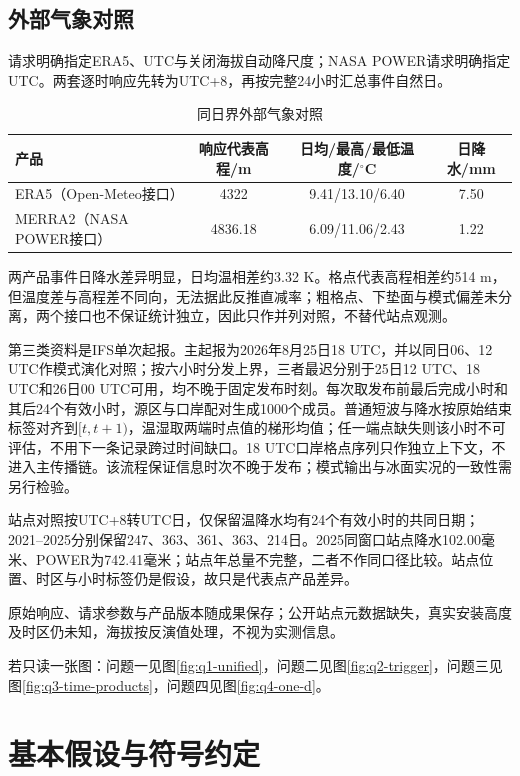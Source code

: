 \subsection{外部气象对照}
请求明确指定ERA5、UTC与关闭海拔自动降尺度；NASA POWER请求明确指定UTC。两套逐时响应先转为UTC+8，再按完整24小时汇总事件自然日。
\begin{table}[htbp]\centering\small
\caption{同日界外部气象对照}\label{tab:extmet}
\begin{tabular}{@{}l c c c@{}}\toprule
产品&响应代表高程/m&日均/最高/最低温度/$^\circ$C&日降水/mm\\\midrule
ERA5（Open-Meteo接口）&4322&9.41/13.10/6.40&7.50\\
MERRA2（NASA POWER接口）&4836.18&6.09/11.06/2.43&1.22\\\bottomrule
\end{tabular}\end{table}
两产品事件日降水差异明显，日均温相差约3.32 K。格点代表高程相差约514 m，但温度差与高程差不同向，无法据此反推直减率；粗格点、下垫面与模式偏差未分离，两个接口也不保证统计独立，因此只作并列对照，不替代站点观测。

第三类资料是IFS单次起报。主起报为2026年8月25日18 UTC，并以同日06、12 UTC作模式演化对照；按六小时分发上界，三者最迟分别于25日12 UTC、18 UTC和26日00 UTC可用，均不晚于固定发布时刻。每次取发布前最后完成小时和其后24个有效小时，源区与口岸配对生成1000个成员。普通短波与降水按原始结束标签对齐到$[t,t+1)$，温湿取两端时点值的梯形均值；任一端点缺失则该小时不可评估，不用下一条记录跨过时间缺口。18 UTC口岸格点序列只作独立上下文，不进入主传播链。该流程保证信息时次不晚于发布；模式输出与冰面实况的一致性需另行检验。

站点对照按UTC+8转UTC日，仅保留温降水均有24个有效小时的共同日期；2021--2025分别保留247、363、361、363、214日。2025同窗口站点降水102.00毫米、POWER为742.41毫米；站点年总量不完整，二者不作同口径比较。站点位置、时区与小时标签仍是假设，故只是代表点产品差异。

原始响应、请求参数与产品版本随成果保存；公开站点元数据缺失，真实安装高度及时区仍未知，海拔按反演值处理，不视为实测信息。



若只读一张图：问题一见图\ref{fig:q1-unified}，问题二见图\ref{fig:q2-trigger}，问题三见图\ref{fig:q3-time-products}，问题四见图\ref{fig:q4-one-d}。

\section{基本假设与符号约定}
